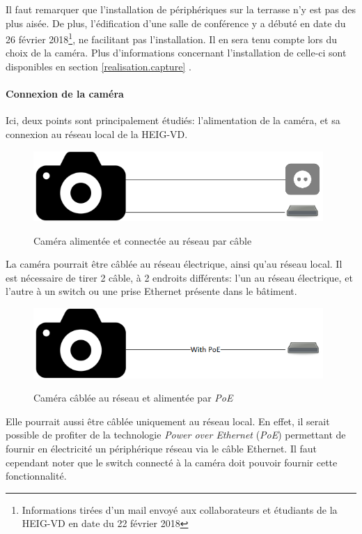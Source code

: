 Il faut remarquer que l'installation de périphériques sur la terrasse n'y est pas des plus aisée. De plus, l'édification d'une salle de conférence y a débuté en date du 26 février 2018\footnote{Informations tirées d'un mail envoyé aux collaborateurs et étudiants de la HEIG-VD en date du 22 février 2018}, ne facilitant pas l'installation. Il en sera tenu compte lors du choix de la caméra. Plus d'informations concernant l'installation de celle-ci sont disponibles en section \ref{realisation.capture} .

\paragraph{Connexion de la caméra}

Ici, deux points sont principalement étudiés: l'alimentation de la caméra, et sa connexion au réseau local de la HEIG-VD.  

\begin{figure}[H]
    \includegraphics[width=110mm]{img/conception/cam_con_1.png}
    \label{fig:cam_connection_1}
    \centering
    \caption{Caméra alimentée et connectée au réseau par câble}
\end{figure}

La caméra pourrait être câblée au réseau électrique, ainsi qu'au réseau local. Il est nécessaire de tirer 2 câble, à 2 endroits différents: l'un au réseau électrique, et l'autre à un switch ou une prise Ethernet présente dans le bâtiment.

\begin{figure}[H]
    \includegraphics[width=110mm]{img/conception/cam_con_2.png}
    \label{fig:cam_connection_2}
    \centering
    \caption{Caméra câblée au réseau et alimentée par \textit{PoE}}
\end{figure}

Elle pourrait aussi être câblée uniquement au réseau local. En effet, il serait possible de profiter de la technologie \textit{Power over Ethernet} (\textit{PoE}) permettant de fournir en électricité un périphérique réseau via le câble Ethernet. Il faut cependant noter que le switch connecté à la caméra doit pouvoir fournir cette fonctionnalité.

